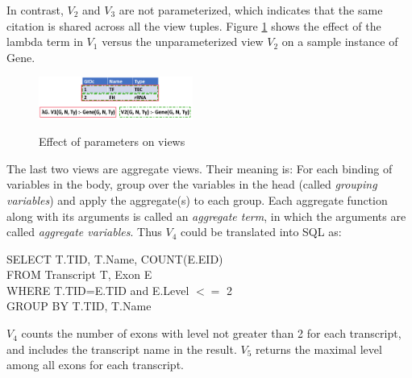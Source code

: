 In contrast, $V_2$ and $V_3$ are not parameterized, which indicates that the same citation is shared across all the view tuples. 
Figure \ref{fig:lambda} shows the effect of the lambda term in $V_1$ versus the unparameterized view $V_2$ on a sample instance of Gene.
\begin{figure}[t!]
    \centering
    \includegraphics[width=0.45\textwidth,height=0.11\textwidth]{Figures/GIDsExample.pdf}
    \caption{Effect of parameters on views}
    \small \label{fig:lambda}
\end{figure}
The last two views are aggregate views. Their meaning is:  For each binding of variables in the body, group over the variables  in the head (called {\em grouping variables}) and apply the aggregate(s) to each group. Each {aggregate function} along with its arguments is called an {\em aggregate term}, in which the arguments are called {\em aggregate variables}.
Thus $V_4$ could be translated into SQL as:
\begin{tabbing}
SELECT T.TID, T.Name, COUNT(E.EID)\\
FROM Transcript T, Exon E\\
WHERE T.TID=E.TID and E.Level $<=$ 2\\
GROUP BY T.TID, T.Name
\end{tabbing}
$V_4$ counts the number of exons  with level not greater than 2 for each transcript, and includes the transcript name in the result.
$V_5$ returns the maximal level among all exons for each transcript. 

